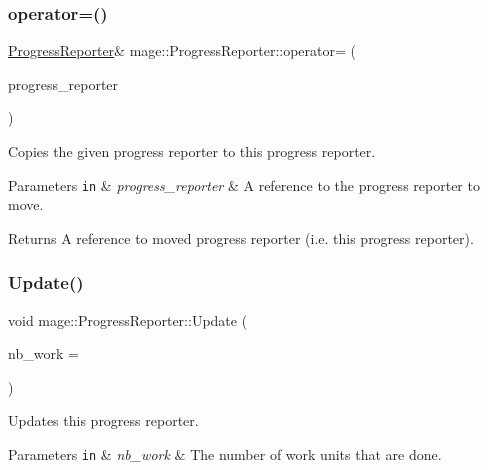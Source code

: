 \subsubsection{\texorpdfstring{operator=()}{operator=()}\hspace{0.1cm}{\footnotesize\ttfamily [2/2]}}
{\footnotesize\ttfamily \hyperlink{classmage_1_1_progress_reporter}{Progress\+Reporter}\& mage\+::\+Progress\+Reporter\+::operator= (\begin{DoxyParamCaption}\item[{\hyperlink{classmage_1_1_progress_reporter}{Progress\+Reporter} \&\&}]{progress\+\_\+reporter }\end{DoxyParamCaption})\hspace{0.3cm}{\ttfamily [delete]}}

Copies the given progress reporter to this progress reporter.


\begin{DoxyParams}[1]{Parameters}
\mbox{\tt in}  & {\em progress\+\_\+reporter} & A reference to the progress reporter to move. \\
\hline
\end{DoxyParams}
\begin{DoxyReturn}{Returns}
A reference to moved progress reporter (i.\+e. this progress reporter). 
\end{DoxyReturn}
\hypertarget{classmage_1_1_progress_reporter_a62009a4466cdd2766afee0da34338338}{}\label{classmage_1_1_progress_reporter_a62009a4466cdd2766afee0da34338338} 
\subsubsection{\texorpdfstring{Update()}{Update()}}
{\footnotesize\ttfamily void mage\+::\+Progress\+Reporter\+::\+Update (\begin{DoxyParamCaption}\item[{\hyperlink{namespacemage_a41c104c036fba3756a74e19f793eeaa1}{U32}}]{nb\+\_\+work = {} }\end{DoxyParamCaption})}

Updates this progress reporter.


\begin{DoxyParams}[1]{Parameters}
\mbox{\tt in}  & {\em nb\+\_\+work} & The number of work units that are done. \\
\hline
\end{DoxyParams}


